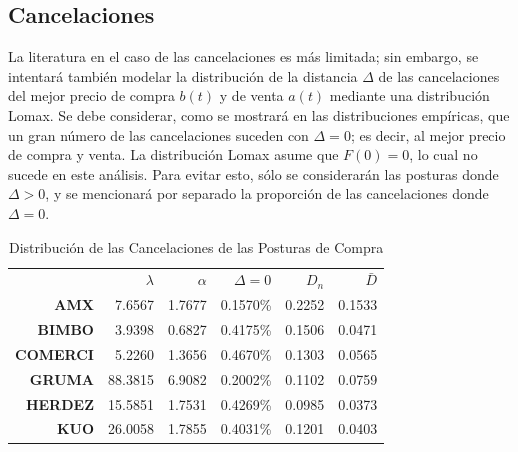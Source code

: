 \documentclass[11pt]{article}
\numberwithin{equation}{section} %
\begin{document}
\clearpage


\subsection{Cancelaciones}

La literatura en el caso de las cancelaciones es más limitada; sin embargo, se intentará también modelar la distribución de la distancia $\Delta$ de las cancelaciones del mejor precio de compra $b(t)$ y de venta $a(t)$ mediante una distribución Lomax. Se debe considerar, como se mostrará en las distribuciones empíricas, que un gran número de las cancelaciones suceden con $\Delta=0$; es decir, al mejor precio de compra y venta. La distribución Lomax asume que $F(0)=0$, lo cual no sucede en este análisis. Para evitar esto, sólo se considerarán las posturas donde $\Delta>0$, y se mencionará por separado la proporción de las cancelaciones donde $\Delta=0$.\\

\begin{table}[htbp]
\centering
\caption{Distribución de las Cancelaciones de las Posturas de Compra}
\renewcommand{\arraystretch}{1.2}
\begin{tabular}{r|r|r|r|r|r|}
\cline{2-6}
& $\lambda$ & $\alpha$ & $\Delta=0$ & $D_n$ & $\bar{D}$ \\
\cline{2-6}
\textbf{AMX}   & 7.6567 & 1.7677 & 0.1570\% & 0.2252 & 0.1533 \\
\textbf{BIMBO} & 3.9398 & 0.6827 & 0.4175\% & 0.1506 & 0.0471 \\
\textbf{COMERCI}   & 5.2260 & 1.3656 & 0.4670\% & 0.1303 & 0.0565 \\
\textbf{GRUMA} & 88.3815 & 6.9082 & 0.2002\% & 0.1102 & 0.0759 \\
\textbf{HERDEZ}   & 15.5851 & 1.7531 & 0.4269\% & 0.0985 & 0.0373 \\
\textbf{KUO}   & 26.0058 & 1.7855 & 0.4031\% & 0.1201 & 0.0403 \\
\cline{2-6}
\end{tabular}%
\label{tab:powercanccompra}%
\end{table}%
\end{document}
